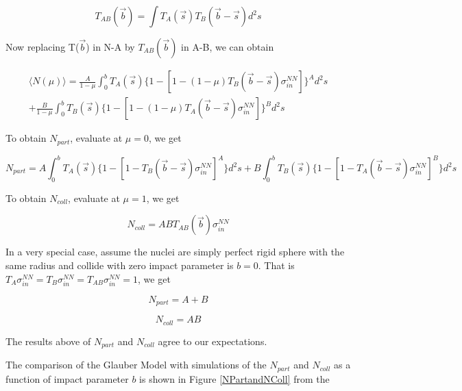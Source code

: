 \begin{equation}
T_{AB}(\vec{b}) = \int T_A(\vec{s}) T_B(\vec{b} - \vec{s}) d^2s 
\end{equation}



Now replacing T($\vec{b}$) in N-A by $T_{AB}(\vec{b})$ in A-B, we can obtain

\begin{equation}
\begin{multlined}
\langle N(\mu) \rangle = \frac{A}{1-\mu} \int_0^b T_A(\vec{s}) \{1 - [1 - (1 - \mu) T_{B}(\vec{b}-\vec{s}) \sigma_{in}^{NN}]\}^A d^2s  \\
  +  \frac{B}{1-\mu} \int_0^b T_B(\vec{s}) \{1 - [1 - (1 - \mu) T_{A}(\vec{b}-\vec{s}) \sigma_{in}^{NN}]\}^B d^2s
\end{multlined}
\end{equation}


To obtain $N_{part}$, evaluate at $\mu = 0$, we get 

\begin{equation}
N_{part} =  A \int_0^b T_A(\vec{s}) \{1 - [1 - T_{B}(\vec{b}-\vec{s}) \sigma_{in}^{NN}]^A\}d^2s +  B \int_0^b T_B(\vec{s}) \{1 - [1 - T_{A}(\vec{b}-\vec{s}) \sigma_{in}^{NN}]^B\} d^2s
\end{equation}

To obtain $N_{coll}$, evaluate at $\mu = 1$, we get

\begin{equation}
N_{coll} = AB T_{AB}(\vec{b}) \sigma_{in}^{NN}
\end{equation}

In a very special case, assume the nuclei are simply perfect rigid sphere with the same radius and collide with zero impact parameter is $b=0$. That is $T_{A} \sigma_{in}^{NN} = T_{B} \sigma_{in}^{NN} = T_{AB} \sigma_{in}^{NN} = 1$, we get 


\begin{equation}
N_{part} = A + B
\end{equation}

\begin{equation}
N_{coll} = AB
\end{equation}

The results above of $N_{part}$ and $N_{coll}$ agree to our expectations. 

The comparison of the Glauber Model with simulations of the $N_{part}$ and $N_{coll}$ as a function of impact parameter $b$ is shown in Figure \ref{NPartandNColl} from the \cite{CentPlot}

